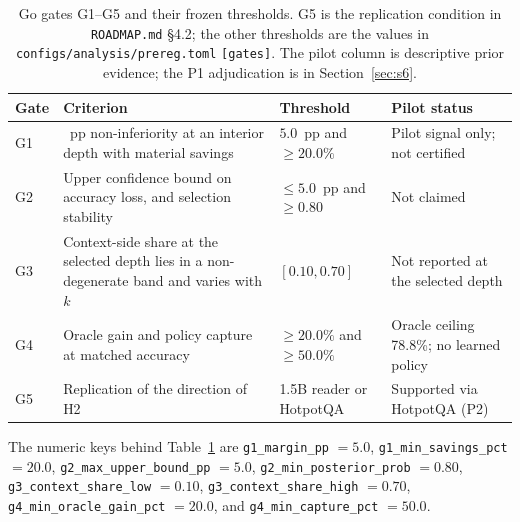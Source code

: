 \documentclass[a4paper,fleqn]{cas-sc}
\begin{document}
\begin{table}[pos=htbp]
  \centering
  \caption{Go gates G1--G5 and their frozen thresholds. G5 is the replication condition in
  \texttt{ROADMAP.md} \S4.2; the other thresholds are the values in
  \texttt{configs/analysis/prereg.toml} \texttt{[gates]}. The pilot column is descriptive prior
  evidence; the P1 adjudication is in Section~\ref{sec:s6}.}
  \label{tab:ggates}
  \small
  \begin{tabularx}{\textwidth}{>{\raggedright\arraybackslash}p{0.9cm}>{\raggedright\arraybackslash}p{6.3cm}>{\raggedright\arraybackslash}p{3.0cm}>{\raggedright\arraybackslash}X}
    \toprule
    \textbf{Gate} & \textbf{Criterion} & \textbf{Threshold} & \textbf{Pilot status} \\
    \midrule
    G1 & 5~pp non-inferiority at an interior depth with material savings & $5.0$~pp and $\ge20.0\%$ & Pilot signal only; not certified \\
    G2 & Upper confidence bound on accuracy loss, and selection stability & $\le5.0$~pp and $\ge0.80$ & Not claimed \\
    G3 & Context-side share at the selected depth lies in a non-degenerate band and varies with $k$ & $[0.10,0.70]$ & Not reported at the selected depth \\
    G4 & Oracle gain and policy capture at matched accuracy & $\ge20.0\%$ and $\ge50.0\%$ & Oracle ceiling 78.8\%; no learned policy \\
    G5 & Replication of the direction of H2 & 1.5B reader or HotpotQA & Supported via HotpotQA (P2) \\
    \bottomrule
  \end{tabularx}
\end{table}

The numeric keys behind Table~\ref{tab:ggates} are
\texttt{g1\_margin\_pp} $=5.0$, \texttt{g1\_min\_savings\_pct} $=20.0$,
\texttt{g2\_max\_upper\_bound\_pp} $=5.0$, \texttt{g2\_min\_posterior\_prob} $=0.80$,
\texttt{g3\_context\_share\_low} $=0.10$, \texttt{g3\_context\_share\_high} $=0.70$,
\texttt{g4\_min\_oracle\_gain\_pct} $=20.0$, and
\texttt{g4\_min\_capture\_pct} $=50.0$.
\end{document}
